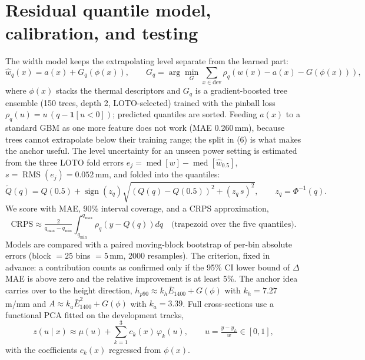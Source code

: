 \documentclass[10pt]{article}
\begin{document}
\section{Residual quantile model, calibration, and testing}
The width model keeps the extrapolating level separate from the learned
part:
\begin{equation}
\hat{w}_q(x) = a(x) + G_q\!\left(\phi(x)\right), \qquad
G_q = \arg\min_{G} \sum_{x \in \mathrm{dev}}
\rho_q\!\left(w(x) - a(x) - G(\phi(x))\right),
\end{equation}
where $\phi(x)$ stacks the thermal descriptors and $G_q$ is a
gradient-boosted tree ensemble (150 trees, depth 2, LOTO-selected) trained
with the pinball loss $\rho_q(u) = u\,(q - \mathbf{1}[u<0])$; predicted
quantiles are sorted. Feeding $a(x)$ to a standard GBM as one more feature
does not work (MAE 0.260\,mm), because trees cannot extrapolate below their
training range; the split in (6) is what makes the anchor useful. The level
uncertainty for an unseen power setting is estimated from the three LOTO
fold errors $e_j = \operatorname{med}[w] - \operatorname{med}[\hat{w}_{0.5}]$,
$s = \operatorname{RMS}(e_j) = 0.052$\,mm, and folded into the quantiles:
\begin{equation}
\tilde{Q}(q) = Q(0.5) + \operatorname{sign}(z_q)
\sqrt{\left(Q(q) - Q(0.5)\right)^2 + \left(z_q\, s\right)^2},
\qquad z_q = \Phi^{-1}(q).
\end{equation}
We score with MAE, 90\% interval coverage, and a CRPS approximation,
\begin{equation}
\mathrm{CRPS} \approx \tfrac{2}{q_{\max} - q_{\min}}
\int_{q_{\min}}^{q_{\max}} \rho_q\!\left(y - Q(q)\right) dq
\quad \text{(trapezoid over the five quantiles)} .
\end{equation}
Models are compared with a paired moving-block bootstrap of per-bin
absolute errors (block $= 25$ bins $= 5$\,mm, 2000 resamples). The
criterion, fixed in advance: a contribution counts as confirmed only if
the 95\% CI lower bound of $\Delta$MAE is above zero and the relative
improvement is at least 5\%. The anchor idea carries over to the height
direction, $h_{p90} \approx k_h \bar{E}_{1400} + G(\phi)$ with
$k_h = 7.27$\,\textmu m/mm and $A \approx k_a \bar{E}_{1400}^2 + G(\phi)$
with $k_a = 3.39$. Full cross-sections use a functional PCA fitted on the
development tracks,
\begin{equation}
z(u \mid x) \approx \mu(u) + \sum_{k=1}^{3} c_k(x)\, \varphi_k(u),
\qquad u = \tfrac{y - y_L}{w} \in [0, 1],
\end{equation}
with the coefficients $c_k(x)$ regressed from $\phi(x)$.
\end{document}
